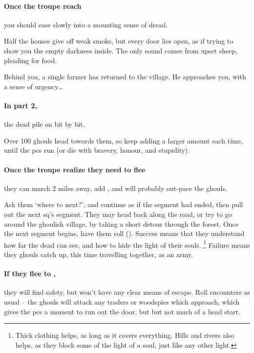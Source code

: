 \paragraph{Once the troupe reach }
you should ease slowly into a mounting sense of dread.

\begin{boxtext}
  Half the houses give off weak smoke, but every door lies open, as if trying to show you the empty darkness inside.
  The only sound comes from upset sheep, pleading for food.

  Behind you, a single farmer has returned to the \gls{village}.
  He approaches you, with a sense of urgency\ldots
\end{boxtext}


\paragraph{In part 2,}
the dead pile on bit by bit.



Over 100 ghouls head towards them, so keep adding a larger amount each time, until the \glspl{pc} run (or die with bravery, honour, and stupidity).

\paragraph{Once the troupe realize they need to flee}
they can march 2 miles away, add , and will probably out-pace the ghouls.

Ask them `where to next?', and continue as if the \gls{segment} had ended, then pull out the next \gls{sq}'s \gls{segment}.
They may head back along the road, or try to go around the ghoulish \gls{village}, by taking a short detour through the forest.
Once the next \gls{segment} begins, have them roll  (\tn[12]).
Success means that they understand how far the dead can see, and how to hide the light of their souls.%
\footnote{Thick clothing helps, as long as it covers everything. Hills and rivers also helps, as they block some of the light of a soul, just like any other light.}
Failure means they ghouls catch up, this time travelling together, as an army.

\paragraph{If they flee to ,}
they will find safety, but won't have any clear means of escape.
Roll encounters as usual -- the ghouls will attack any traders or woodspies which approach, which gives the \glspl{pc} a moment to run out the door, but but not much of a head start.


